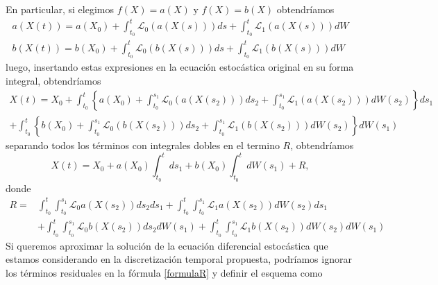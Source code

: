\documentclass{article}
\begin{document}
\noindent
En particular, si elegimos $f(X)=a(X)$ y $f(X)=b(X)$ obtendríamos
\begin{equation}
\begin{split}
a(X(t))=a\left(X_0\right)+\int_{t_{0}}^{t} \mathcal{L}_{0} (a(X(s))) d s+\int_{t_{0}}^{t} \mathcal{L}_{1} (a(X(s))) d W\\
b(X(t))=b\left(X_0\right)+\int_{t_{0}}^{t} \mathcal{L}_{0} (b(X(s))) d s+\int_{t_{0}}^{t} \mathcal{L}_{1} (b(X(s))) d W
\end{split}
\end{equation}
luego, insertando estas expresiones en la ecuación estocástica original en su forma integral, obtendríamos
\begin{multline}
X(t)=X_0+\int_{t_{0}}^{t}\left\{a\left(X_0\right)+\int_{t_{0}}^{s_{1}} \mathcal{L}_{0} (a\left(X\left(s_{2}\right)\right))d s_{2}+\int_{t_{0}}^{s_{1}} \mathcal{L}_{1}( a\left(X\left(s_{2}\right)\right)) d W\left(s_{2}\right)\right\} d s_{1}\\ +\int_{t_{0}}^{t}\left\{b\left(X_0\right)+\int_{t_{0}}^{s_{1}} \mathcal{L}_{0}( b\left(X\left(s_{2}\right)\right)) d s_{2}+\int_{t_{0}}^{s_{1}} \mathcal{L}_{1} (b\left(X\left(s_{2}\right)\right)) d W\left(s_{2}\right)\right\} d W\left(s_{1}\right)
\end{multline}
separando todos los términos con integrales dobles en el termino $R$, obtendríamos
\begin{equation}
\label{formulaR}
X(t)=X_0+a\left(X_0\right) \int_{t_{0}}^{t} d s_{1}+b\left(X_0\right) \int_{t_{0}}^{t} d W\left(s_{1}\right)+R,
\end{equation}
donde 
\begin{equation}\begin{aligned}
R = & \int_{t_{0}}^{t} \int_{t_{0}}^{s_{1}} \mathcal{L}_{0} a\left(X\left(s_{2}\right)\right) d s_{2} d s_{1}+\int_{t_{0}}^{t} \int_{t_{0}}^{s_{1}} \mathcal{L}_{1} a\left(X\left(s_{2}\right)\right) d W\left(s_{2}\right) d s_{1} \\
&+\int_{t_{0}}^{t} \int_{t_{0}}^{s_{1}} \mathcal{L}_{0} b\left(X\left(s_{2}\right)\right) d s_{2} d W\left(s_{1}\right)+\int_{t_{0}}^{t} \int_{t_{0}}^{s_{1}} \mathcal{L}_{1} b\left(X\left(s_{2}\right)\right) d W\left(s_{2}\right) d W\left(s_{1}\right)
\end{aligned}\end{equation}
Si queremos aproximar la solución de la ecuación diferencial estocástica que estamos considerando en la discretización temporal propuesta, podríamos ignorar los términos residuales en la fórmula \ref{formulaR} y definir el esquema como
\end{document}
